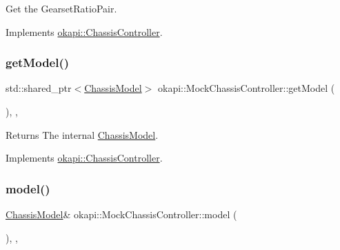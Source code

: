 Get the Gearset\+Ratio\+Pair. 



Implements \mbox{\hyperlink{classokapi_1_1ChassisController_aa19351888b997d4a6596dac24520ebff}{okapi\+::\+Chassis\+Controller}}.

\mbox{\label{classokapi_1_1MockChassisController_a8c502c38c9547c425d7e47d849c05380}} 
\subsubsection{\texorpdfstring{getModel()}{getModel()}}
{\footnotesize\ttfamily std\+::shared\+\_\+ptr$<$\mbox{\hyperlink{classokapi_1_1ChassisModel}{Chassis\+Model}}$>$ okapi\+::\+Mock\+Chassis\+Controller\+::get\+Model (\begin{DoxyParamCaption}{ }\end{DoxyParamCaption})\hspace{0.3cm}{\ttfamily [inline]}, {\ttfamily [override]}, {\ttfamily [virtual]}}

\begin{DoxyReturn}{Returns}
The internal \mbox{\hyperlink{classokapi_1_1ChassisModel}{Chassis\+Model}}. 
\end{DoxyReturn}


Implements \mbox{\hyperlink{classokapi_1_1ChassisController_a1971d4b54b61718437824c026aca53c9}{okapi\+::\+Chassis\+Controller}}.

\mbox{\label{classokapi_1_1MockChassisController_af70bde7c9c24071c7fa052d99c0e6059}} 
\subsubsection{\texorpdfstring{model()}{model()}}
{\footnotesize\ttfamily \mbox{\hyperlink{classokapi_1_1ChassisModel}{Chassis\+Model}}\& okapi\+::\+Mock\+Chassis\+Controller\+::model (\begin{DoxyParamCaption}{ }\end{DoxyParamCaption})\hspace{0.3cm}{\ttfamily [inline]}, {\ttfamily [override]}, {\ttfamily [virtual]}}

